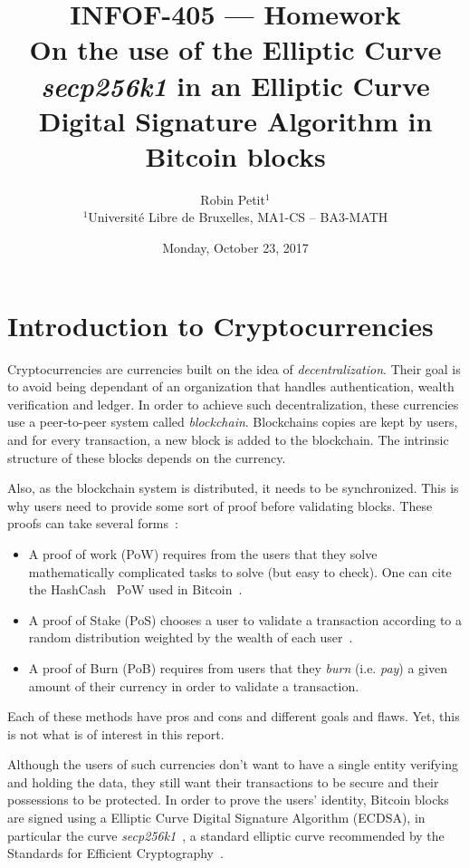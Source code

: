 \documentclass{IEEEtran}
\title{INFOF-405 --- Homework\\On the use of the Elliptic Curve \textit{secp256k1} in an Elliptic Curve Digital Signature Algorithm in Bitcoin blocks}
\author{Robin Petit$^1$\\
\mbox{}
$^1$Université Libre de Bruxelles, MA1-CS -- BA3-MATH}
\date{Monday, October 23, 2017}
\begin{document}
\maketitle

\section{Introduction to Cryptocurrencies}
Cryptocurrencies are currencies built on the idea of \textit{decentralization}. Their goal is to
avoid being dependant of an organization that handles authentication, wealth verification and
ledger. In order to achieve such decentralization, these currencies use a peer-to-peer system called
\textit{blockchain}. Blockchains copies are kept by users, and for every transaction, a new block is
added to the blockchain. The intrinsic structure of these blocks depends on the currency.

Also, as the blockchain system is distributed, it needs to be synchronized. This is why users need
to provide some sort of proof before validating blocks. These proofs can take several
forms~\cite{proofOfX,Bentov17}:
\begin{itemize}
	\item A proof of work (PoW) requires from the users that they solve mathematically complicated
	tasks to solve (but easy to check). One can cite the HashCash~\cite{hashcash02} PoW used in
	Bitcoin~\cite{bitcoin08}.
	\item A proof of Stake (PoS) chooses a user to validate a transaction according to a random
	distribution weighted by the wealth of each user~\cite{PoSvsPoW}.
	\item A proof of Burn (PoB) requires from users that they \textit{burn} (i.e. \textit{pay}) a
	given amount of their currency in order to validate a transaction.
\end{itemize}

Each of these methods have pros and cons and different goals and flaws. Yet, this is not what is of
interest in this report.

Although the users of such currencies don't want to have a single entity verifying and holding the
data, they still want their transactions to be secure and their possessions to be protected. In order
to prove the users' identity, Bitcoin blocks are signed using a Elliptic Curve Digital Signature Algorithm
(ECDSA), in particular the curve \textit{secp256k1}~\cite{bitcoinsecp256k1}, a standard elliptic curve
recommended by the Standards for Efficient Cryptography~\cite{SEC2}.
\end{document}
